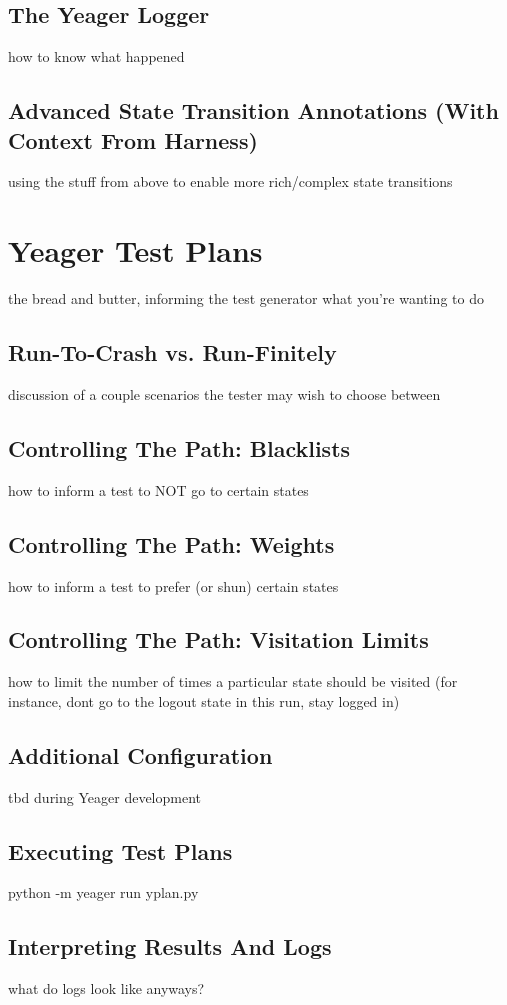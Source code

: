 \subsection{The Yeager Logger}
how to know what happened

\subsection{Advanced State Transition Annotations (With Context From Harness)}
using the stuff from above to enable more rich/complex state transitions

\section{Yeager Test Plans}
the bread and butter, informing the test generator what you're wanting to do

\subsection{Run-To-Crash vs. Run-Finitely}
discussion of a couple scenarios the tester may wish to choose between

\subsection{Controlling The Path: Blacklists}
how to inform a test to NOT go to certain states

\subsection{Controlling The Path: Weights}
how to inform a test to prefer (or shun) certain states

\subsection{Controlling The Path: Visitation Limits}
how to limit the number of times a particular state should be visited (for instance, dont go to the logout state in this run, stay logged in)

\subsection{Additional Configuration}
tbd during Yeager development

\subsection{Executing Test Plans}
python -m yeager run yplan.py

\subsection{Interpreting Results And Logs}
what do logs look like anyways?
